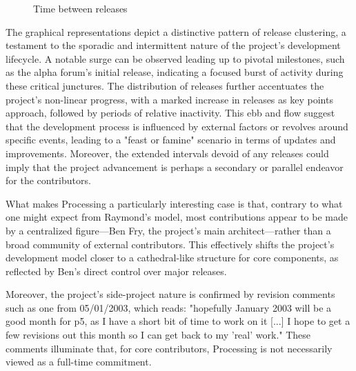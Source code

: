 \begin{figure}[h!]
	\centering
	\caption{Time between releases}
	\label{fig:releases-lines}
\end{figure}


\begin{multicols}{3}
	\noindent
	The graphical representations depict a distinctive pattern of release clustering, a testament to the sporadic and intermittent nature of the project's development lifecycle. A notable surge can be observed leading up to pivotal milestones, such as the alpha forum's initial release, indicating a focused burst of activity during these critical junctures.
	\noindent
	The distribution of releases further accentuates the project's non-linear progress, with a marked increase in releases as key points approach, followed by periods of relative inactivity. This ebb and flow suggest that the development process is influenced by external factors or revolves around specific events, leading to a "feast or famine" scenario in terms of updates and improvements.
	\noindent
	Moreover, the extended intervals devoid of any releases could imply that the project advancement is perhaps a secondary or parallel endeavor for the contributors.
\end{multicols}


What makes Processing a particularly interesting case is that, contrary to what one might expect from Raymond's model, most contributions appear to be made by a centralized figure—Ben Fry, the project's main architect—rather than a broad community of external contributors. This effectively shifts the project's development model closer to a cathedral-like structure for core components, as reflected by Ben's direct control over major releases.

Moreover, the project’s side-project nature is confirmed by revision comments such as one from 05/01/2003, which reads: "hopefully January 2003 will be a good month for p5, as I have a short bit of time to work on it [...] I hope to get a few revisions out this month so I can get back to my 'real' work." These comments illuminate that, for core contributors, Processing is not necessarily viewed as a full-time commitment.

